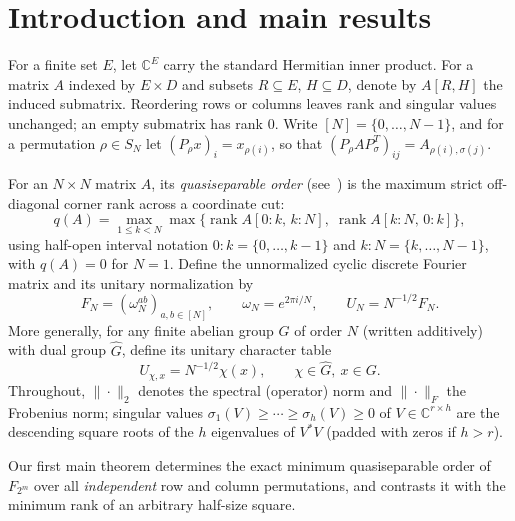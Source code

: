 \documentclass[11pt,reqno]{amsart}
\numberwithin{equation}{section}
\theoremstyle{definition}
\theoremstyle{remark}
\newcommand{\C}{\mathbb{C}}
\newcommand{\rank}{\operatorname{rank}}
\begin{document}
\section{Introduction and main results}
\label{sec:intro}

For a finite set $E$, let $\C^E$ carry the standard Hermitian inner product. For a matrix $A$ indexed by $E\times D$ and subsets $R\subseteq E$, $H\subseteq D$, denote by $A[R,H]$ the induced submatrix. Reordering rows or columns leaves rank and singular values unchanged; an empty submatrix has rank $0$. Write $[N]=\{0,\ldots,N-1\}$, and for a permutation $\rho\in S_N$ let $(P_\rho x)_i = x_{\rho(i)}$, so that $(P_\rho A P_\sigma^T)_{ij}=A_{\rho(i),\sigma(j)}$.

For an $N\times N$ matrix $A$, its \emph{quasiseparable order} (see~\cite{PSV23}) is the maximum strict off-diagonal corner rank across a coordinate cut:
\begin{equation}
\label{eq:q-def}
q(A) = \max_{1\le k<N}\max\bigl\{\rank A[0{:}k,\, k{:}N],\; \rank A[k{:}N,\, 0{:}k]\bigr\},
\end{equation}
using half-open interval notation $0{:}k=\{0,\ldots,k-1\}$ and $k{:}N=\{k,\ldots,N-1\}$, with $q(A)=0$ for $N=1$. Define the unnormalized cyclic discrete Fourier matrix and its unitary normalization by
\begin{equation}
\label{eq:FN-def}
F_N = (\omega_N^{ab})_{a,b\in[N]},\qquad \omega_N = e^{2\pi i/N},\qquad U_N = N^{-1/2}F_N.
\end{equation}
More generally, for any finite abelian group $G$ of order $N$ (written additively) with dual group $\widehat{G}$, define its unitary character table
\begin{equation}
\label{eq:char-table}
U_{\chi,x} = N^{-1/2}\chi(x),\qquad \chi\in\widehat{G},\ x\in G.
\end{equation}
Throughout, $\|\cdot\|_2$ denotes the spectral (operator) norm and $\|\cdot\|_F$ the Frobenius norm; singular values $\sigma_1(V)\ge \cdots\ge \sigma_h(V)\ge 0$ of $V\in\C^{r\times h}$ are the descending square roots of the $h$ eigenvalues of $V^*V$ (padded with zeros if $h>r$).

Our first main theorem determines the exact minimum quasiseparable order of $F_{2^m}$ over all \emph{independent} row and column permutations, and contrasts it with the minimum rank of an arbitrary half-size square.
\end{document}
